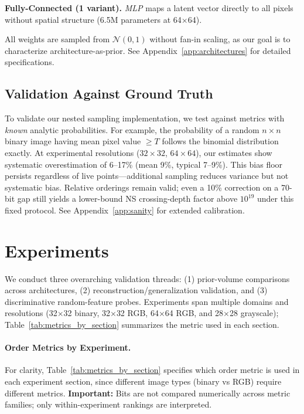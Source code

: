 \documentclass{article}
\begin{document}
\textbf{Fully-Connected (1 variant).}
\emph{MLP} maps a latent vector directly to all pixels without spatial structure (6.5M parameters at 64$\times$64).

All weights are sampled from $\mathcal{N}(0, 1)$ without fan-in scaling, as our goal is to characterize architecture-as-prior. See Appendix~\ref{app:architectures} for detailed specifications.

\subsection{Validation Against Ground Truth}

To validate our nested sampling implementation, we test against metrics with \emph{known} analytic probabilities. For example, the probability of a random $n \times n$ binary image having mean pixel value $\geq T$ follows the binomial distribution exactly. At experimental resolutions ($32 \times 32$, $64 \times 64$), our estimates show systematic overestimation of 6--17\% (mean 9\%, typical 7--9\%). This bias floor persists regardless of live points---additional sampling reduces variance but not systematic bias. Relative orderings remain valid; even a 10\% correction on a 70-bit gap still yields a lower-bound NS crossing-depth factor above $10^{19}$ under this fixed protocol. See Appendix~\ref{app:sanity} for extended calibration.


\section{Experiments}
\label{sec:experiments}


We conduct three overarching validation threads: (1) prior-volume comparisons across architectures, (2) reconstruction/generalization validation, and (3) discriminative random-feature probes. Experiments span multiple domains and resolutions (32$\times$32 binary, 32$\times$32 RGB, 64$\times$64 RGB, and 28$\times$28 grayscale); Table~\ref{tab:metrics_by_section} summarizes the metric used in each section.

\paragraph{Order Metrics by Experiment.} For clarity, Table~\ref{tab:metrics_by_section} specifies which order metric is used in each experiment section, since different image types (binary vs RGB) require different metrics. \textbf{Important:} Bits are not compared numerically across metric families; only within-experiment rankings are interpreted.
\end{document}
